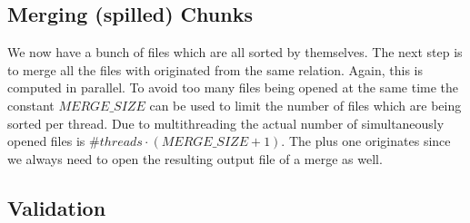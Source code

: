 \subsection{Merging (spilled) Chunks}
We now have a bunch of files which are all sorted by themselves. The next step is to merge all the files with originated from the same relation. Again, this is computed in parallel. To avoid too many files being opened at the same time the constant $MERGE\_SIZE$ can be used to limit the number of files which are being sorted per thread. Due to multithreading the actual number of simultaneously opened files is $\#threads \cdot (MERGE\_SIZE + 1)$. The plus one originates since we always need to open the resulting output file of a merge as well.


\subsection{Validation}